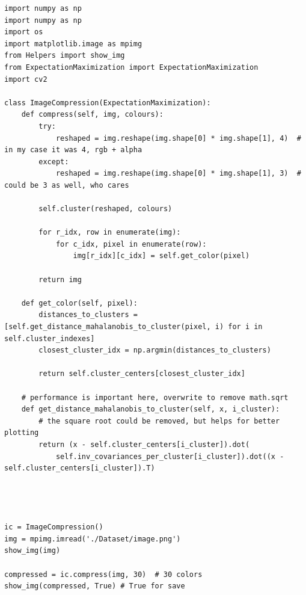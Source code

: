 \begin{lstlisting}[style=py]
import numpy as np
import numpy as np
import os
import matplotlib.image as mpimg
from Helpers import show_img
from ExpectationMaximization import ExpectationMaximization
import cv2

class ImageCompression(ExpectationMaximization):
    def compress(self, img, colours):
        try:
            reshaped = img.reshape(img.shape[0] * img.shape[1], 4)  # in my case it was 4, rgb + alpha
        except:
            reshaped = img.reshape(img.shape[0] * img.shape[1], 3)  # could be 3 as well, who cares

        self.cluster(reshaped, colours)

        for r_idx, row in enumerate(img):
            for c_idx, pixel in enumerate(row):
                img[r_idx][c_idx] = self.get_color(pixel)

        return img

    def get_color(self, pixel):
        distances_to_clusters = [self.get_distance_mahalanobis_to_cluster(pixel, i) for i in self.cluster_indexes]
        closest_cluster_idx = np.argmin(distances_to_clusters)

        return self.cluster_centers[closest_cluster_idx]

    # performance is important here, overwrite to remove math.sqrt
    def get_distance_mahalanobis_to_cluster(self, x, i_cluster):
        # the square root could be removed, but helps for better plotting
        return (x - self.cluster_centers[i_cluster]).dot(
            self.inv_covariances_per_cluster[i_cluster]).dot((x - self.cluster_centers[i_cluster]).T)




ic = ImageCompression()
img = mpimg.imread('./Dataset/image.png')
show_img(img)

compressed = ic.compress(img, 30)  # 30 colors
show_img(compressed, True) # True for save

\end{lstlisting}




